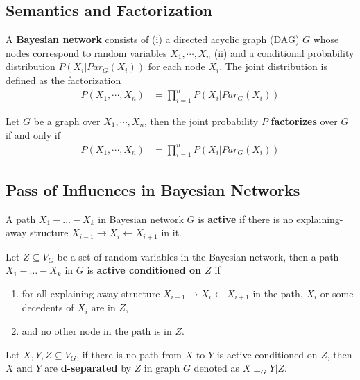 \documentclass[11pt]{article}
\begin{document}
	\subsection{Semantics and Factorization}
	\begin{definition}
		A \textbf{Bayesian network} consists of (i) a directed acyclic graph (DAG) $G$ whose nodes correspond to random variables $X_1, \cdots, X_n$
		 (ii) and a conditional probability distribution $P(X_i|Par_G(X_i))$ for each node $X_i$. The joint distribution is defined as the factorization
		 \begin{align}
		 	P(X_1, \cdots, X_n) &= \prod_{i=1}^n P(X_i|Par_G(X_i))
		 \end{align}
	\end{definition}
	
	\begin{definition}
		Let $G$ be a graph over $X_1, \cdots, X_n$, then the joint probability $P$ \textbf{factorizes} over $G$ if and only if
		\begin{align}
			P(X_1, \cdots, X_n) &= \prod_{i=1}^n P(X_i|Par_G(X_i))
		\end{align}
	\end{definition}
	
	\subsection{Pass of Influences in Bayesian Networks}
	\begin{definition}
		A path $X_1 - \dots - X_k$ in Bayesian network $G$ is \textbf{active} if there is no explaining-away structure $X_{i-1} \rightarrow X_i \leftarrow X_{i+1}$ in it.
	\end{definition}
	
	\begin{definition}
		Let $Z \subseteq V_G$ be a set of random variables in the Bayesian network, then a path $X_1 - \dots - X_k$ in $G$ is \textbf{active conditioned on $Z$} if 
		\begin{enumerate}
			\item for all explaining-away structure $X_{i-1} \rightarrow X_i \leftarrow X_{i+1}$ in the path, $X_i$ or some decedents of $X_i$ are in $Z$,
			\item \ul{and} no other node in the path is in $Z$.
		\end{enumerate}
	\end{definition}
	
	\begin{definition}
		Let $X, Y, Z \subseteq V_G$, if there is no path from $X$ to $Y$ is active conditioned on $Z$, then $X$ and $Y$ are \textbf{d-separated} by $Z$ in graph $G$ denoted as $X \perp_G Y | Z$.
	\end{definition}
\end{document}
